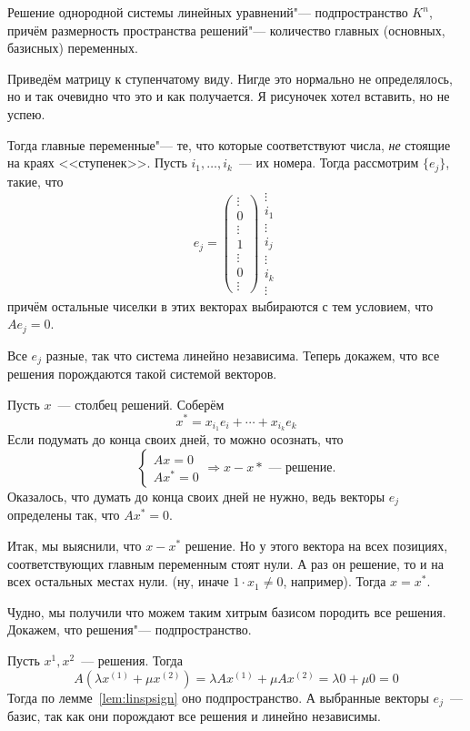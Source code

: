\documentclass[12pt]{../../../notes}
\begin{document}
\begin{thrm}\label{thrm:homsystsolspc}
  Решение однородной системы линейных уравнений"--- подпространство $K^n$, причём размерность
  пространства решений"--- количество главных (основных, базисных) переменных.
\end{thrm}
\begin{ittproof}
  Приведём матрицу к ступенчатому\cite[стр.~50]{Vinberg} виду. Нигде это нормально не 
  определялось, но и так очевидно что это и как получается. Я рисуночек хотел вставить, но не
  успею.
  
  Тогда главные переменные"--- те, что которые соответствуют числа, \emph{не} стоящие на краях 
  <<ступенек>>. Пусть $i_1, \dotsc , i_k$~--- их номера. Тогда рассмотрим $\{e_j\}$, такие, что
  \[
    e_j = 
    \begin{pmatrix}
      \vdots \\
      0 \\
      \vdots \\
      1 \\
      \vdots \\
      0\\
      \vdots
    \end{pmatrix}
    \begin{matrix}
      \vdots \\
      i_1 \\
      \vdots \\
      i_j \\
      \vdots \\
      i_k\\
      \vdots
    \end{matrix}
  \]
  причём остальные чиселки в этих векторах выбираются с тем условием, что $A e_j = 0$.

  Все $e_j$ разные, так что система линейно независима. Теперь докажем, что все решения
  порождаются такой системой векторов. 

  Пусть $x$~--- столбец решений. Соберём
  \[
    x^* = x_{i_1} e_i + \dotsb +x_{i_k} e_k 
  \]
  Если подумать до конца своих дней, то можно осознать, что
  \[
    \begin{cases}
      A x = 0 \\
      A x^* = 0
    \end{cases} \Rightarrow x-x*\text{~--- решение}.
  \]
  Оказалось, что думать до конца своих дней не нужно, ведь векторы $e_j$ определены так, что  
  $Ax^* = 0$. 
  
  Итак, мы выяснили, что $x-x^*$ решение. Но у этого вектора на всех позициях, соответствующих
  главным переменным стоят нули. А раз он решение, то и на всех остальных местах нули.
  (ну, иначе $1\cdot x_1 \neq 0$, например). Тогда $x = x^*$.

  Чудно, мы получили что можем таким хитрым базисом породить все решения. Докажем, что
  решения"--- подпространство.
  
  Пусть $x^1, x^2$~--- решения. Тогда
  \[
    A(\lambda x^{(1)} + \mu x^{(2)}) = \lambda A x^{(1)} + \mu A x^{(2)} = \lambda 0 + \mu 0 = 0
  \]
  Тогда по лемме~\ref{lem:linspsign} оно подпространство. А выбранные векторы $e_j$~--- базис,
  так как они порождают все решения и линейно независимы.
\end{ittproof}  
\end{document}
